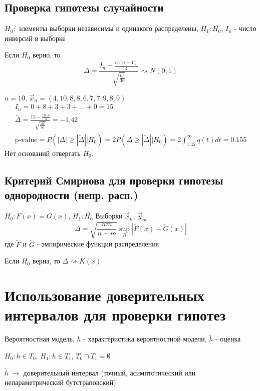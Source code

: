 \documentclass{article}
\begin{document}
\subsection{Проверка гипотезы случайности}
$H_0:$ элементы выборки независимы и одинакого распределены, $H_1:\bar{H_0}$,
$I_n$ - число инверсий в выборке
\begin{theorem}
  Если $H_0$ верно, то
\[
  \Delta=\frac{I_n-\frac{n(n-1)}{4}}{\sqrt{\frac{n^{3}}{36}}} \rightsquigarrow N(0,1)
\]
\end{theorem}
\begin{eg}
  $n=10$, $\vec{x}_n=(4, 10, 8, 8, 6, 7, 7, 9, 8, 9)$
  \begin{gather*}
    I_n=0+8+3+3+\dots + 0 = 15 \\ 
    \tilde{\Delta}=\frac{15-\frac{10\cdot 9}{4}}{\sqrt{\frac{10^3}{36}}}=-1.42 \\ 
    \text{p-value}=P(|\Delta| \ge |\tilde{\Delta}| \big| H_0)=2P(\Delta \ge |\tilde{\Delta}| \big| H_0)
    = 2 \int_{ 1.42}^{\infty}q(t)dt=0.155
  \end{gather*}
  Нет оснований отвергать $H_0$.
\end{eg}


\subsection{Критерий Смирнова для проверки гипотезы однородности (непр. расп.)}
$H_0: F(x)=G(x)$, $H_1: \bar{H_0}$ 
Выборки $\vec{x}_n$, $\vec{y}_m$
\[
  \Delta = \sqrt{\frac{nm}{n+m}}\sup \limits_{R}|\tilde{F}(x)-\tilde{G}(x)|
\]
где $\tilde{F}$ и $\tilde{G}$ - эмпирические функции распределения
\begin{theorem}
  Если $H_0$ верна, то $\Delta \rightsquigarrow K(x)$
\end{theorem}

\section{Использование доверительных интервалов для проверки гипотез}
Вероятностная модель, $h$ - характеристика вероятностной модели, $\tilde{h}$ - оценка

$H_0: h \in T_0$, $H_1: h \in T_1$, $T_0 \cap T_1 = \emptyset$

$\tilde{h} \ \rightarrow$  доверительный интервал (точный, асимптотический или непараметрический бутстраповский)
\end{document}
